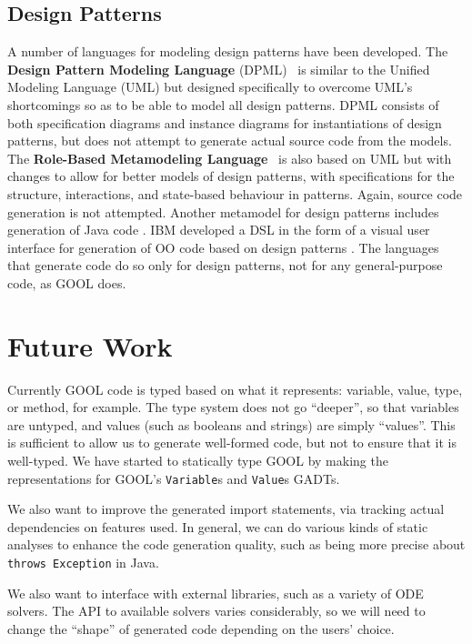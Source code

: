 \documentclass[sigplan,review,prologue,dvipsnames]{acmart}
\begin{document}
\subsection{Design Patterns}

A number of languages for modeling design patterns have been developed. The
\textbf{Design Pattern Modeling Language} (DPML)~\cite{mapelsden2002design} is similar
to the Unified Modeling Language (UML) but designed specifically to overcome
UML's shortcomings so as to be able to model all design patterns. DPML consists of
both specification diagrams and instance diagrams for instantiations of design
patterns, but does not attempt to generate actual source code from the models.
The \textbf{Role-Based Metamodeling Language}~\cite{kim2003uml} is also based on UML but
with changes to allow for better models of design patterns, with specifications
for the structure, interactions, and state-based behaviour in patterns. Again,
source code generation is not attempted. Another metamodel for design patterns
includes generation of Java code \cite{albin2001meta}. IBM developed a DSL in 
the form of a visual user interface for generation of OO code based on design 
patterns \cite{budinsky1996automatic}. The languages that
generate code do so only for design patterns, not for any general-purpose code,
as GOOL does.

\section{Future Work} \label{sec:future}

Currently GOOL code is typed based on what it represents:
variable, value, type, or method, for example. The type system does not
go ``deeper'', so that variables are untyped, and values (such as booleans
and strings) are simply ``values''.  This is sufficient to allow us to
generate well-formed code, but not to ensure that it is well-typed.
We have started to statically type GOOL by making the
representations for GOOL's \verb|Variable|s and \verb|Value|s GADTs. 

We also want to improve the generated import statements, via tracking
actual dependencies on features used.  In general, we can do various 
kinds of static analyses to enhance the code generation quality,
such as being more precise about \verb|throws Exception| in Java.

We also want to interface with external libraries, such as a variety
of ODE solvers. The API to available solvers varies considerably, so
we will need to change the ``shape'' of generated code depending on
the users' choice.
\end{document}
